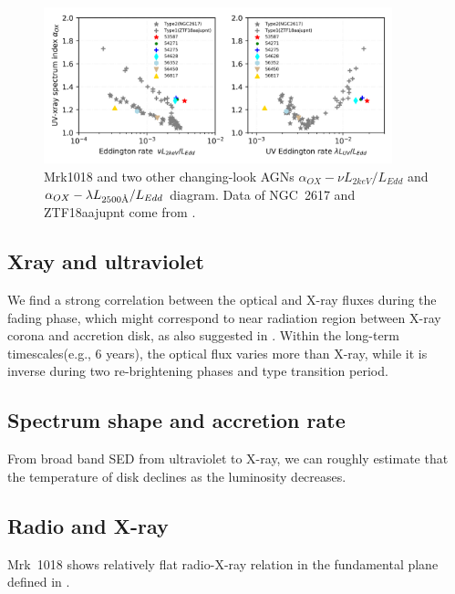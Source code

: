 \documentclass{aastex63}
\newcommand{\angstrom}{\text{\normalfont\AA}}
\begin{document}
\begin{figure}
\centering
	\includegraphics[width=0.9\textwidth]{./pic/Mrk1018_subplots_plus_2individuals_alpha_ox_L_x_Luv_rate.png}
    \caption{Mrk1018 and two other changing-look AGNs $\alpha_{OX}-\nu L_{2keV}/L_{Edd}$ and $\alpha_{OX}-\lambda L_{2500 \angstrom}/L_{Edd}$ diagram. Data of NGC~2617 and ZTF18aajupnt come from \citet{2019arXiv190904676R}.  }
    \label{fig:alpha_ox_luv}
\end{figure}


\subsection{Xray and ultraviolet }
We find a strong correlation between the optical and X-ray fluxes during the fading phase, which might correspond to near radiation region  between X-ray corona and accretion disk, as also suggested in \citet{2017A&A...607L...9K}. Within the long-term timescales(e.g., 6 years), the optical flux varies more than X-ray, while it is inverse during two re-brightening phases and type transition period.



\subsection{Spectrum shape and accretion rate}
From broad band SED from ultraviolet to X-ray, we can roughly estimate that the temperature of disk declines as the luminosity decreases.



\subsection{Radio and X-ray}
Mrk~1018 shows relatively flat radio-X-ray relation in the fundamental plane defined in \citet{2012MNRAS.419..267P}.
\end{document}
